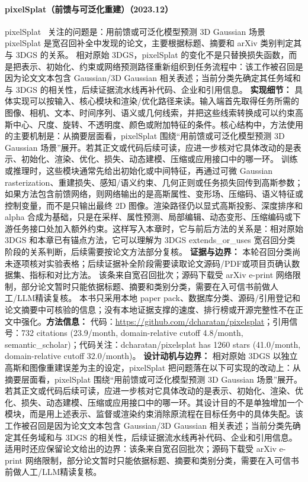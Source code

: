 \paragraph{pixelSplat（前馈与可泛化重建）（2023.12）}
pixelSplat~\cite{2312_12337} 关注的问题是：用前馈或可泛化模型预测 3D Gaussian 场景 pixelSplat 是宽召回补全中发现的论文，主要根据标题、摘要和 arXiv 类别判定其与 3DGS 的关系。
相对原始 3DGS，pixelSplat 的变化不是只替换损失函数，而是把表示、初始化、约束或网络预测路径重新组织到任务流程中：该工作被召回是因为论文文本包含 Gaussian/3D Gaussian 相关表述；当前分类先确定其任务域和与 3DGS 的相关性，后续证据流水线再补代码、企业和引用信息。
\textbf{实现细节：} 具体实现可以按输入、核心模块和渲染/优化路径来读。输入端首先取得任务所需的图像、相机、文本、时间序列、语义或几何线索，并把这些线索转换成可以约束高斯中心、尺度、旋转、不透明度、颜色或附加特征的条件。核心结构中，方法使用的主要机制是：从摘要层面看，pixelSplat 围绕“用前馈或可泛化模型预测 3D Gaussian 场景”展开。若其正文或代码后续可读，应进一步核对它具体改动的是表示、初始化、渲染、优化、损失、动态建模、压缩或应用接口中的哪一环。 训练或推理时，这些模块通常先给出初始化或中间特征，再通过可微 Gaussian rasterization、重建损失、感知/语义约束、几何正则或任务损失回传到高斯参数；如果方法包含前馈网络，则网络输出的是高斯属性、变形场、压缩码、语义特征或控制变量，而不是只输出最终 2D 图像。渲染路径仍以显式高斯投影、深度排序和 alpha 合成为基础，只是在采样、属性预测、局部编辑、动态变形、压缩编码或下游任务接口处加入额外约束。这样写入本章时，它与前后方法的关系是：相对原始 3DGS 和本章已有锚点方法，它可以理解为 3DGS extends\_or\_uses 宽召回分类阶段的关系判断，后续需要按论文方法部分复核。
\textbf{证据与边界：} 本轮召回分类尚未逐项核对实验表格；后续证据补全阶段需要读取论文源码/PDF或项目页确认数据集、指标和对比方法。 该条来自宽召回批次；源码下载受 arXiv e-print 网络限制，部分论文暂时只能依据标题、摘要和类别分类，需要在入可信书前做人工/LLM精读复核。 本书只采用本地 paper pack、数据库分类、源码/引用登记和论文摘要中可核验的信息；没有本地证据支撑的速度、排行榜或开源完整性不在正文中强化。\textbf{方法信息：} 代码：\url{https://github.com/dcharatan/pixelsplat}；引用信号：732 citations (23.9/month, domain-relative cutoff 4.8/month, semantic\_scholar)；代码关注：dcharatan/pixelsplat has 1260 stars (41.0/month, domain-relative cutoff 32.0/month)。
\textbf{设计动机与边界：} 相对原始 3DGS 以独立高斯和图像重建误差为主的设定，pixelSplat 把问题落在以下可实现的改动上：从摘要层面看，pixelSplat 围绕“用前馈或可泛化模型预测 3D Gaussian 场景”展开。若其正文或代码后续可读，应进一步核对它具体改动的是表示、初始化、渲染、优化、损失、动态建模、压缩或应用接口中的哪一环。其设计目的不是单独增加一个模块，而是用上述表示、监督或渲染约束消除原流程在目标任务中的具体失配。该工作被召回是因为论文文本包含 Gaussian/3D Gaussian 相关表述；当前分类先确定其任务域和与 3DGS 的相关性，后续证据流水线再补代码、企业和引用信息。适用时还应保留论文给出的边界：该条来自宽召回批次；源码下载受 arXiv e-print 网络限制，部分论文暂时只能依据标题、摘要和类别分类，需要在入可信书前做人工/LLM精读复核。
